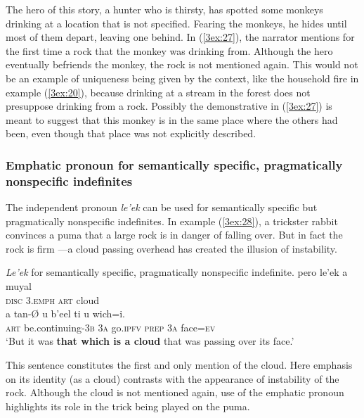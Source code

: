 \documentclass[output=paper]{langsci/langscibook}
\begin{document}
The hero of this story, a hunter who is thirsty, has spotted some monkeys drinking at a location that is not specified.  Fearing the monkeys, he hides until most of them depart, leaving one behind.  In (\ref{3ex:27}), the narrator mentions for the first time a rock that the monkey was drinking from.  Although the hero eventually befriends the monkey, the rock is not mentioned again.  This would not be an example of uniqueness being given by the context, like the household fire in example (\ref{3ex:20}), because drinking at a stream in the forest does not presuppose drinking from a rock.  Possibly the demonstrative in (\ref{3ex:27}) is meant to suggest that this monkey is in the same place where the others had been, even though that place was not explicitly described.


\subsubsection{Emphatic pronoun for semantically specific, pragmatically nonspecific indefinites}\label{3sec:343}

The independent pronoun {\emph{le'ek}} can be used for semantically specific but pragmatically nonspecific indefinites. In example (\ref{3ex:28}), a trickster rabbit convinces a puma that a large rock is in danger of falling over. But in fact the rock is firm ---a cloud passing overhead has created the illusion of instability.

\begin{exe}
\ex\label{3ex:28}
{\emph{Le'ek}} for semantically specific, pragmatically nonspecific indefinite. 
\exi{}
\gll	pero			le'ek 			a	muyal \\
	{\textsc{disc}}		3.{\textsc{emph}}	{\textsc{art}}	cloud \\
\glt
\exi{}
\gll	a 	tan-{\O}				u		b’eel			ti			u		wich=i. \\
	{\textsc{art}}	be.continuing-{\textsc{3b}}	{\textsc{3a}}	go.{\textsc{ipfv}}	{\textsc{prep}}		{\textsc{3a}}	face={\textsc{ev}} \\
\glt	`But it was {\textbf{that which is a cloud}} that was passing over its face.'
\end{exe}

This sentence constitutes the first and only mention of the cloud. Here emphasis on its identity (as a cloud) contrasts with the appearance of instability of the rock. Although the cloud is not mentioned again, use of the emphatic pronoun highlights its role in the trick being played on the puma.
\end{document}

